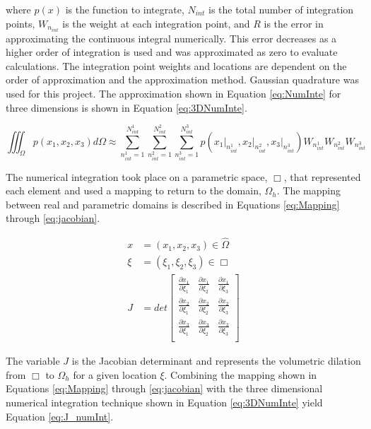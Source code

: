 \documentclass[a4paper, 12pt]{article}
\begin{document}
\noindent
where $p(x)$ is the function to integrate, $N_{int}$ is the total number 
of integration points, $W_{n_{int}}$ is the weight at each integration point, 
and $R$ is the error in approximating the continuous integral numerically.
This error decreases as a higher order of integration is used and was
approximated as zero to evaluate calculations.
The integration point weights and locations are dependent on the order of
approximation and the approximation method. Gaussian quadrature was
used for this project. The approximation shown in Equation \ref{eq:NumInte}
for three dimensions is shown in Equation \ref{eq:3DNumInte}.

\begin{equation} \label{eq:3DNumInte}
\iiint_{\Omega} p(x_1, x_2, x_3) d\Omega \approx 
  \sum_{n^1_{int}=1}^{N^1_{int}} 
  \sum_{n^2_{int}=1}^{N^2_{int}} 
  \sum_{n^3_{int}=1}^{N^3_{int}} 
  p(x_1\Big|_{n^1_{int}}, 
  x_2\Big|_{n^2_{int}}, 
  x_3\Big|_{n^3_{int}})
  W_{n^1_{int}}
  W_{n^2_{int}}
  W_{n^3_{int}}
\end{equation}

The numerical integration took place on a parametric space, $\Box$, that represented each 
element and used a mapping to return to the domain, $\Omega_h$. 
The mapping between real and parametric domains is described in 
Equations \ref{eq:Mapping} through \ref{eq:jacobian}.

\begin{align} 
x   &= (x_1, x_2, x_3) \in \hat{\Omega}
  \label{eq:Mapping} \\
\xi &= (\xi_1, \xi_2, \xi_3) \in \Box \\
J &= det
  \begin{bmatrix}
    \frac{\partial x_1}{\partial \xi_1} & 
      \frac{\partial x_1}{\partial \xi_2} & 
      \frac{\partial x_1}{\partial \xi_3} \\
    \frac{\partial x_2}{\partial \xi_1} & 
      \frac{\partial x_2}{\partial \xi_2} & 
      \frac{\partial x_2}{\partial \xi_3} \\
    \frac{\partial x_3}{\partial \xi_1} & 
      \frac{\partial x_3}{\partial \xi_2} & 
      \frac{\partial x_3}{\partial \xi_3} \\
  \end{bmatrix}
  \label{eq:jacobian}
\end{align}

\noindent
The variable $J$ is the Jacobian determinant and represents
the volumetric dilation from $\Box$ to $\Omega_h$ for a given location $\xi$.
Combining the mapping shown in Equations \ref{eq:Mapping} through
\ref{eq:jacobian} with the three dimensional numerical 
integration technique shown in Equation \ref{eq:3DNumInte} yield
Equation \ref{eq:J_numInt}.
\end{document}
